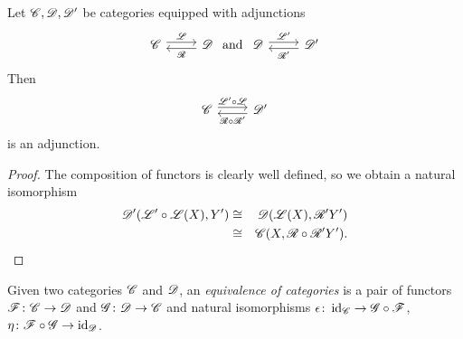 \documentclass[10pt]{amsart}
\begin{document}
\begin{prop}\label{composeadjunctions}
  Let $\mathscr{C}, \mathscr{D}, \mathscr{D}^\prime$ be categories equipped with adjunctions
  $$\begin{tikzcd}
    \C \arrow[shift left]{r}{\LA} & \D \arrow[shift left]{l}{\RA}
  \end{tikzcd}
  \ \text{and}\ 
  \begin{tikzcd}
    \D \arrow[shift left]{r}{\LA^\prime} & \D^\prime \arrow[shift left]{l}{\RA^\prime}
  \end{tikzcd}$$
  Then 
  $$\begin{tikzcd}
    \C \arrow[shift left]{r}{\LA^\prime \circ \LA} & \D^\prime \arrow[shift left]{l}{\RA \circ \RA^\prime}
  \end{tikzcd}$$
  is an adjunction.

  \begin{proof}
    The composition of functors is clearly well defined, so we obtain a natural isomorphism
    \begin{eqnarray*}
      \mathscr{D}^\prime(\mathscr{L}^\prime \circ \mathscr{L}(X), Y^\prime) &\cong& 
      \mathscr{D}(\mathscr{L}(X), \mathscr{R}^\prime Y^\prime)\\
      &\cong& \mathscr{C}(X, \mathscr{R} \circ \mathscr{R}^\prime Y^\prime).
    \end{eqnarray*}
  \end{proof}
\end{prop}

\begin{defn}
  Given two categories $\mathscr{C}$ and $\mathscr{D}$, an {\it equivalence of categories} is a pair of functors $\mathscr{F} \colon \mathscr{C} \to \mathscr{D}$ and $\mathscr{G} \colon \mathscr{D} \to \mathscr{C}$ and natural isomorphisms $\epsilon \colon \operatorname{id}_{\mathscr{C}} \to \mathscr{G} \circ \mathscr{F}$, $\eta \colon \mathscr{F} \circ \mathscr{G} \to \operatorname{id}_{\mathscr{D}}$.
\end{defn}
\end{document}
